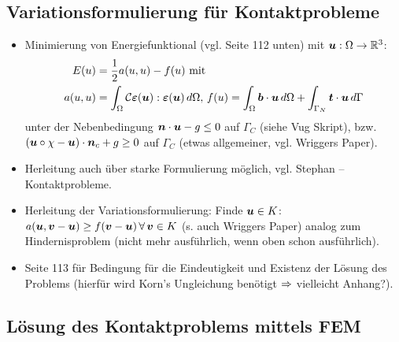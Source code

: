 \subsection{Variationsformulierung für Kontaktprobleme}

\begin{itemize}
\item Minimierung von Energiefunktional (vgl. \cite{KikOden} Seite 112 unten) mit $\boldsymbol{u}: \Omega\rightarrow \mathbb{R}^3$:
\begin{align*}
	E(u)& = \frac 1 2 a(u,u)-f(u) \text{ mit } \\
	 a(u,u) &= \int_\Omega {\mathcal C} \boldsymbol{\varepsilon} (\boldsymbol u): \boldsymbol{\varepsilon}(\boldsymbol u) \, d\Omega , \, f(u) = \int_\Omega \boldsymbol b \cdot \boldsymbol u \, d\Omega + \int_{\Gamma_N} \boldsymbol t \cdot \boldsymbol u \, d\Gamma
\end{align*}
unter der Nebenbedingung $\boldsymbol n \cdot \boldsymbol u - g \le 0$ auf $\Gamma_C$  (siehe Vug Skript), bzw. $(\boldsymbol u\circ \chi - \boldsymbol u)\cdot \boldsymbol n_c + g \ge 0$ auf $\Gamma_C$ (etwas allgemeiner, vgl. Wriggers Paper).
\item Herleitung auch über starke Formulierung möglich, vgl. Stephan – Kontaktprobleme.
\item Herleitung der Variationsformulierung: Finde $\boldsymbol u \in K$: $a(\boldsymbol u,\boldsymbol v-\boldsymbol u) \ge f(\boldsymbol v-\boldsymbol u) \, \forall \, \boldsymbol v \in K$ (s. auch Wriggers Paper) analog zum Hindernisproblem (nicht mehr ausführlich, wenn oben schon ausführlich).
\item \cite{KikOden} Seite 113 für Bedingung für die Eindeutigkeit und Existenz der Lösung des Problems (hierfür wird Korn's Ungleichung benötigt $\Rightarrow$ vielleicht Anhang?).
\end{itemize}

\subsection{Lösung des Kontaktproblems mittels FEM}

